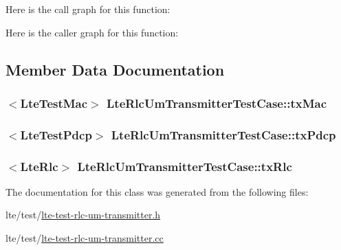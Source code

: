 Here is the call graph for this function\+:




Here is the caller graph for this function\+:




\subsection{Member Data Documentation}
\subsubsection[{\texorpdfstring{tx\+Mac}{txMac}}]{$<${\bf Lte\+Test\+Mac}$>$ Lte\+Rlc\+Um\+Transmitter\+Test\+Case\+::tx\+Mac\hspace{0.3cm}{\ttfamily [protected]}}\hypertarget{classLteRlcUmTransmitterTestCase_a9cd57d7805fdc18d579e28045b50436c}{}\label{classLteRlcUmTransmitterTestCase_a9cd57d7805fdc18d579e28045b50436c}
\subsubsection[{\texorpdfstring{tx\+Pdcp}{txPdcp}}]{$<${\bf Lte\+Test\+Pdcp}$>$ Lte\+Rlc\+Um\+Transmitter\+Test\+Case\+::tx\+Pdcp\hspace{0.3cm}{\ttfamily [protected]}}\hypertarget{classLteRlcUmTransmitterTestCase_a46b95c0ea6f9904e977e73b766abc9b5}{}\label{classLteRlcUmTransmitterTestCase_a46b95c0ea6f9904e977e73b766abc9b5}
\subsubsection[{\texorpdfstring{tx\+Rlc}{txRlc}}]{$<${\bf Lte\+Rlc}$>$ Lte\+Rlc\+Um\+Transmitter\+Test\+Case\+::tx\+Rlc\hspace{0.3cm}{\ttfamily [protected]}}\hypertarget{classLteRlcUmTransmitterTestCase_a7c000ff01d3966105aef18401bed9bfe}{}\label{classLteRlcUmTransmitterTestCase_a7c000ff01d3966105aef18401bed9bfe}


The documentation for this class was generated from the following files\+:\begin{DoxyCompactItemize}
\item 
lte/test/\hyperlink{lte-test-rlc-um-transmitter_8h}{lte-\/test-\/rlc-\/um-\/transmitter.\+h}\item 
lte/test/\hyperlink{lte-test-rlc-um-transmitter_8cc}{lte-\/test-\/rlc-\/um-\/transmitter.\+cc}\end{DoxyCompactItemize}
